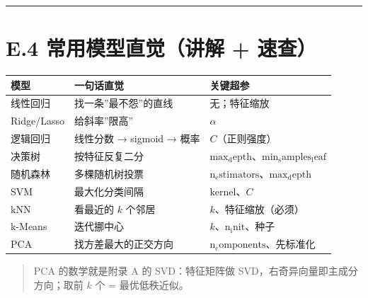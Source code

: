 \begin{center}\rule{0.5\linewidth}{0.5pt}\end{center}

\section{E.4 常用模型直觉（讲解 +
速查）}\label{e.4-ux5e38ux7528ux6a21ux578bux76f4ux89c9ux8bb2ux89e3-ux901fux67e5}

{\def\LTcaptype{none} %
\begin{longtable}[]{@{}
  >{\raggedright\arraybackslash}p{}
  >{\raggedright\arraybackslash}p{}
  >{\raggedright\arraybackslash}p{}@{}}
\toprule\noalign{}
\begin{minipage}[b]{\linewidth}\raggedright
模型
\end{minipage} & \begin{minipage}[b]{\linewidth}\raggedright
一句话直觉
\end{minipage} & \begin{minipage}[b]{\linewidth}\raggedright
关键超参
\end{minipage} \\
\midrule\noalign{}
\endhead
\bottomrule\noalign{}
\endlastfoot
线性回归 & 找一条''最不怨''的直线 & 无；特征缩放 \\
Ridge/Lasso & 给斜率''限高'' & \(\alpha\) \\
逻辑回归 & 线性分数 → sigmoid → 概率 & \(C\)（正则强度） \\
决策树 & 按特征反复二分 &
\(\mathrm{max_depth}\)、\(\mathrm{min_samples_leaf}\) \\
随机森林 & 多棵随机树投票 &
\(\mathrm{n_estimators}\)、\(\mathrm{max_depth}\) \\
SVM & 最大化分类间隔 & \(\mathrm{kernel}\)、\(C\) \\
kNN & 看最近的 \(k\) 个邻居 & \(k\)、特征缩放（必须） \\
k-Means & 迭代挪中心 & \(k\)、\(\mathrm{n_init}\)、种子 \\
PCA & 找方差最大的正交方向 & \(\mathrm{n_components}\)、先标准化 \\
\end{longtable}
}

\begin{quote}
PCA 的数学就是附录 A 的 SVD：特征矩阵做
SVD，右奇异向量即主成分方向；取前 \(k\) 个 = 最优低秩近似。
\end{quote}

